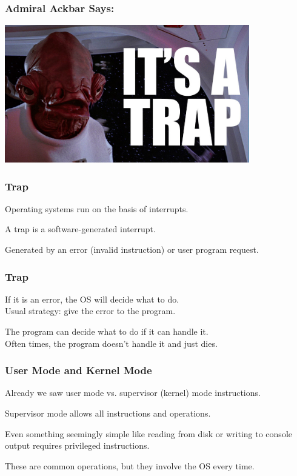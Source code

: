 \begin{frame}
	\frametitle{Admiral Ackbar Says:}

	\begin{center}
		\includegraphics[width=0.8\textwidth]{images/itsatrap.jpg}
	\end{center}

\end{frame}


\begin{frame}
	\frametitle{Trap}

	Operating systems run on the basis of interrupts.

	A \alert{trap} is a software-generated interrupt.

	Generated by an error (invalid instruction) or user program request.

\end{frame}

\begin{frame}
	\frametitle{Trap}

	If it is an error, the OS will decide what to do.\\
	\quad Usual strategy: give the error to the program.

	The program can decide what to do if it can handle it.\\
	\quad Often times, the program doesn't handle it and just dies.

\end{frame}

\begin{frame}
	\frametitle{User Mode and Kernel Mode}

	Already we saw user mode vs. supervisor (kernel) mode instructions.

	Supervisor mode allows all instructions and operations.

	Even something seemingly simple like reading from disk or writing to console output requires privileged instructions.

	These are common operations, but they involve the OS every time.


\end{frame}

